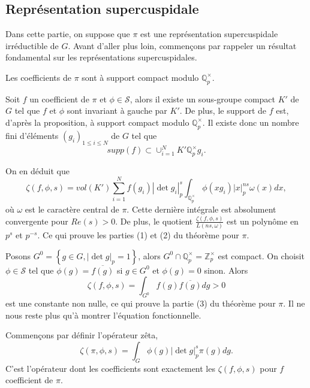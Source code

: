 \subsection{Représentation supercuspidale}

Dans cette partie, on suppose que $\pi$ est une représentation supercuspidale irréductible de $G$. Avant d'aller plus loin, commençons par rappeler un résultat fondamental sur les représentations supercuspidales.

\begin{proposition}
Les coefficients de $\pi$ sont à support compact modulo $\mathbb{Q}_p^\times$.
\end{proposition}

Soit $f$ un coefficient de $\pi$ et $\phi \in \mathcal{S}$, alors il existe un sous-groupe compact $K'$ de $G$ tel que $f$ et $\phi$ sont invariant à gauche par $K'$. De plus, le support de $f$ est, d'après la proposition, à support compact modulo $\mathbb{Q}_p^\times$. Il existe donc un nombre fini d'éléments $(g_i)_{1 \leq i \leq N}$ de $G$ tel que
\begin{equation}
supp(f) \subset \cup_{i=1}^N K'\mathbb{Q}_p^\times g_i.
\end{equation}

On en déduit que
\begin{equation}
\zeta(f,\phi,s) = vol(K') \sum_{i=1}^N f(g_i)|\det g_i|_p^s \int_{\mathbb{Q}_p^\times} \phi(xg_i)|x|_p^{ns}\omega(x)dx,
\end{equation}
où $\omega$ est le caractère central de $\pi$. Cette dernière intégrale est absolument convergente pour $Re(s) > 0$. De plus, le quotient $\frac{\zeta(f,\phi,s)}{L(ns,\omega)}$ est un polynôme en $p^s$ et $p^{-s}$. Ce qui prouve les parties (1) et (2) du théorème pour $\pi$.

Posons $G^0=\left\lbrace g \in G, |\det g|_p = 1 \right\rbrace$, alors $G^0 \cap \mathbb{Q}_p^\times = \mathbb{Z}_p^\times$ est compact. On choisit $\phi \in \mathcal{S}$ tel que $\phi(g) = \overline{f(g)}$ si $g \in G^0$ et $\phi(g)=0$ sinon. Alors
\begin{equation}
\zeta(f, \phi, s) = \int_{G^0} f(g)\overline{f(g)} dg > 0
\end{equation}
est une constante non nulle, ce qui prouve la partie (3) du théorème pour $\pi$. Il ne nous reste plus qu'à montrer l'équation fonctionnelle.

Commençons par définir l'opérateur zêta,
\begin{equation}
\zeta(\pi, \phi, s) = \int_G \phi(g)|\det g|_p^s\pi(g) dg.
\end{equation}
C'est l'opérateur dont les coefficients sont exactement les $\zeta(f, \phi,s)$ pour $f$ coefficient de $\pi$.


